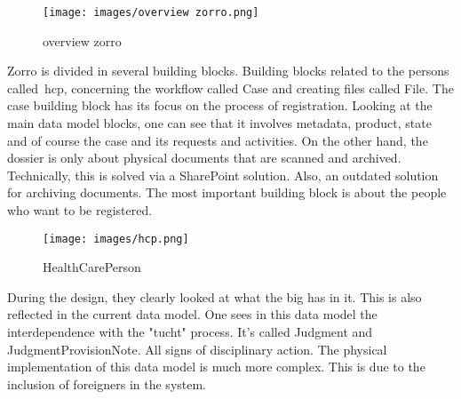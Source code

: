 \begin{wrapfigure} {r}{0.3\textwidth} 
\texttt{[image: images/overview zorro.png]}
\caption{overview zorro}
\label{fig:overview_zorro}
\end{wrapfigure}
Zorro is divided in several building blocks.
Building blocks related to the persons called~\acrfull{hcp}, concerning the workflow called Case and creating files called File.
The case building block has its focus on the process of registration. 
Looking at the main data model blocks, one can see that it involves metadata, product, state and of course the case and its requests and activities.
On the other hand, the dossier is only about physical documents that are scanned and archived.
Technically, this is solved via a SharePoint solution.
Also, an outdated solution for archiving documents.
The most important building block is about the people who want to be registered.
\begin{figure}
    \centering
    \texttt{[image: images/hcp.png]}
    \caption{HealthCarePerson}
    \label{fig:hcp}
\end{figure}
During the design, they clearly looked at what the \acrshort{big} has in it.
This is also reflected in the current data model.
One sees in this data model the interdependence with the "tucht" process.
It's called Judgment and JudgmentProvisionNote.
All signs of disciplinary action.
The physical implementation of this data model is much more complex.
This is due to the inclusion of foreigners in the system.
